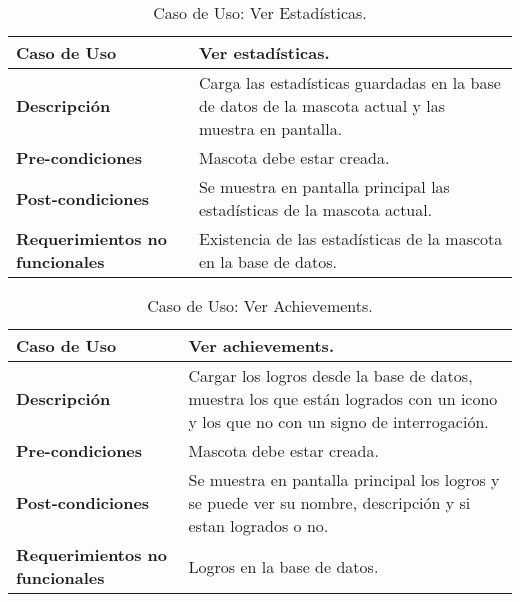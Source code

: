 \begin{table}[htbp!]
  \centering
  \begin{tabular}{|p{4cm}|p{6cm}|}\hline
    \bf{Caso de Uso}                   & Ver estad\'isticas. \\ \hline
    \bf{Descripci\'on}                 & Carga las estad\'isticas guardadas en la base de datos de la mascota actual y las muestra en pantalla. \\ \hline
    \bf{Pre-condiciones}               & Mascota debe estar creada. \\ \hline
    \bf{Post-condiciones}              & Se muestra en pantalla principal las estad\'isticas de la mascota actual. \\ \hline
    \bf{Requerimientos no funcionales} & Existencia de las estad\'isticas de la mascota en la base de datos. \\ \hline
  \end{tabular}
  \caption[~Caso de Uso: Ver Estad\'isticas]{Caso de Uso: Ver Estad\'isticas.}
  \label{table:VerEstadisticas}
\end{table}

\begin{table}[htbp!]
  \centering
  \begin{tabular}{|p{4cm}|p{6cm}|}\hline
    \bf{Caso de Uso}                   & Ver achievements. \\ \hline
    \bf{Descripci\'on}                 & Cargar los logros desde la base de datos, muestra los que est\'an logrados con un icono y los que no con un signo de interrogaci\'on. \\ \hline
    \bf{Pre-condiciones}               & Mascota debe estar creada. \\ \hline
    \bf{Post-condiciones}              & Se muestra en pantalla principal los logros y se puede ver su nombre, descripci\'on y si estan logrados o no. \\ \hline
    \bf{Requerimientos no funcionales} & Logros en la base de datos.  \\ \hline
  \end{tabular}
  \caption[~Caso de Uso: Ver Achievements]{Caso de Uso: Ver Achievements.}
  \label{table:VerAchievements}
\end{table}

